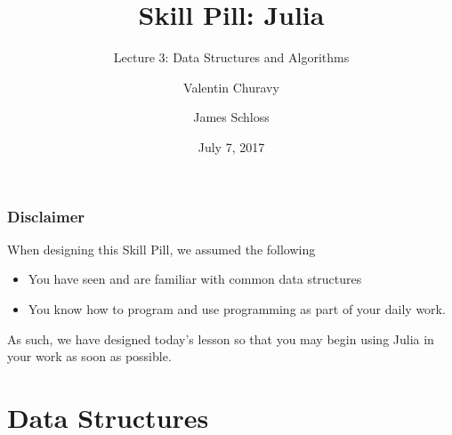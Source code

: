 \documentclass{beamer}
\title[Skill Pill]{Skill Pill: Julia} %
\subtitle{Lecture 3: Data Structures and Algorithms}
\author{Valentin Churavy \and James Schloss} %
\institute[OIST] %
{
Okinawa Institute of Science and Technology \\ %
\textit{valentin.churavy@oist.jp} \\
\textit{james.schloss@oist.jp} %
}
\date{July 7, 2017} %
\begin{document}

\begin{frame}
\vspace*{1.4cm}
\titlepage %
\end{frame}



\begin{frame}
  \tableofcontents
\end{frame}

\begin{frame}
\frametitle{Disclaimer}

When designing this Skill Pill, we assumed the following
\begin{itemize}
\item You have seen and are familiar with common data structures
\item You know how to program and use programming as part of your daily work. 
\end{itemize}

As such, we have designed today's lesson so that you may begin using Julia in your work as soon as possible.

\end{frame}
\section{Data Structures}
\end{document}
